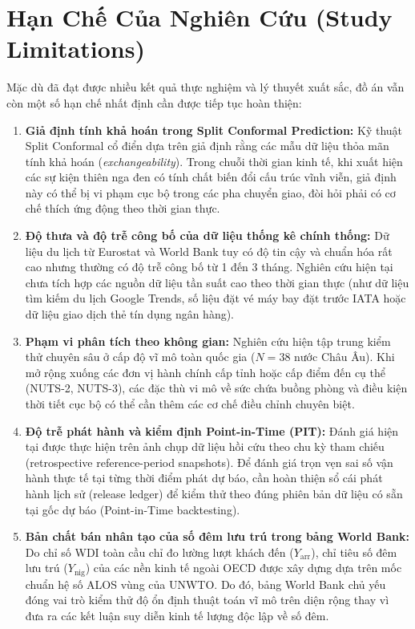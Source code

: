 \section{Hạn Chế Của Nghiên Cứu (Study Limitations)}
\label{sec:conclusion_limitations}

Mặc dù đã đạt được nhiều kết quả thực nghiệm và lý thuyết xuất sắc, đồ án vẫn còn một số hạn chế nhất định cần được tiếp tục hoàn thiện:
\begin{enumerate}
    \item \textbf{Giả định tính khả hoán trong Split Conformal Prediction:} Kỹ thuật Split Conformal cổ điển dựa trên giả định rằng các mẫu dữ liệu thỏa mãn tính khả hoán (\textit{exchangeability}). Trong chuỗi thời gian kinh tế, khi xuất hiện các sự kiện thiên nga đen có tính chất biến đổi cấu trúc vĩnh viễn, giả định này có thể bị vi phạm cục bộ trong các pha chuyển giao, đòi hỏi phải có cơ chế thích ứng động theo thời gian thực.
    \item \textbf{Độ thưa và độ trễ công bố của dữ liệu thống kê chính thống:} Dữ liệu du lịch từ Eurostat và World Bank tuy có độ tin cậy và chuẩn hóa rất cao nhưng thường có độ trễ công bố từ 1 đến 3 tháng. Nghiên cứu hiện tại chưa tích hợp các nguồn dữ liệu tần suất cao theo thời gian thực (như dữ liệu tìm kiếm du lịch Google Trends, số liệu đặt vé máy bay đặt trước IATA hoặc dữ liệu giao dịch thẻ tín dụng ngân hàng).
    \item \textbf{Phạm vi phân tích theo không gian:} Nghiên cứu hiện tập trung kiểm thử chuyên sâu ở cấp độ vĩ mô toàn quốc gia ($N=38$ nước Châu Âu). Khi mở rộng xuống các đơn vị hành chính cấp tỉnh hoặc cấp điểm đến cụ thể (NUTS-2, NUTS-3), các đặc thù vi mô về sức chứa buồng phòng và điều kiện thời tiết cục bộ có thể cần thêm các cơ chế điều chỉnh chuyên biệt.
    \item \textbf{Độ trễ phát hành và kiểm định Point-in-Time (PIT):} Đánh giá hiện tại được thực hiện trên ảnh chụp dữ liệu hồi cứu theo chu kỳ tham chiếu (retrospective reference-period snapshots). Để đánh giá trọn vẹn sai số vận hành thực tế tại từng thời điểm phát dự báo, cần hoàn thiện sổ cái phát hành lịch sử (release ledger) để kiểm thử theo đúng phiên bản dữ liệu có sẵn tại gốc dự báo (Point-in-Time backtesting).
    \item \textbf{Bản chất bán nhân tạo của số đêm lưu trú trong bảng World Bank:} Do chỉ số WDI toàn cầu chỉ đo lường lượt khách đến ($Y_{\text{arr}}$), chỉ tiêu số đêm lưu trú ($Y_{\text{nig}}$) của các nền kinh tế ngoài OECD được xây dựng dựa trên mốc chuẩn hệ số ALOS vùng của UNWTO. Do đó, bảng World Bank chủ yếu đóng vai trò kiểm thử độ ổn định thuật toán vĩ mô trên diện rộng thay vì đưa ra các kết luận suy diễn kinh tế lượng độc lập về số đêm.
\end{enumerate}

